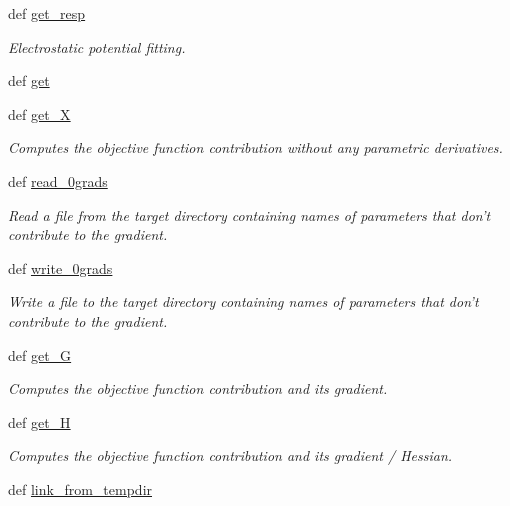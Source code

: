 \begin{DoxyCompactItemize}
def \hyperlink{classforcebalance_1_1abinitio_1_1AbInitio_a2e7f4452fb37b5e7eced48d8276741f5}{get\-\_\-resp}
\begin{DoxyCompactList}\small\item\em Electrostatic potential fitting. \end{DoxyCompactList}\item 
def \hyperlink{classforcebalance_1_1abinitio_1_1AbInitio_a2bb3ed7209707f688ec8b731392466b5}{get}
\item 
def \hyperlink{classforcebalance_1_1target_1_1Target_a606dd136f195c267c05a2455405e5949}{get\-\_\-\-X}
\begin{DoxyCompactList}\small\item\em Computes the objective function contribution without any parametric derivatives. \end{DoxyCompactList}\item 
def \hyperlink{classforcebalance_1_1target_1_1Target_a09bb0e8350a17974c908a9728b2709bf}{read\-\_\-0grads}
\begin{DoxyCompactList}\small\item\em Read a file from the target directory containing names of parameters that don't contribute to the gradient. \end{DoxyCompactList}\item 
def \hyperlink{classforcebalance_1_1target_1_1Target_acc7601caa4b719bf7e31961c2eb30dd7}{write\-\_\-0grads}
\begin{DoxyCompactList}\small\item\em Write a file to the target directory containing names of parameters that don't contribute to the gradient. \end{DoxyCompactList}\item 
def \hyperlink{classforcebalance_1_1target_1_1Target_afa8cc38c8bba8861c072e789717aa049}{get\-\_\-\-G}
\begin{DoxyCompactList}\small\item\em Computes the objective function contribution and its gradient. \end{DoxyCompactList}\item 
def \hyperlink{classforcebalance_1_1target_1_1Target_a1d2ee27fe86a09769c1816af23b09adb}{get\-\_\-\-H}
\begin{DoxyCompactList}\small\item\em Computes the objective function contribution and its gradient / Hessian. \end{DoxyCompactList}\item 
def \hyperlink{classforcebalance_1_1target_1_1Target_a5aa4958cea0a48138511567a076c5a82}{link\-\_\-from\-\_\-tempdir}

\end{DoxyCompactItemize}
